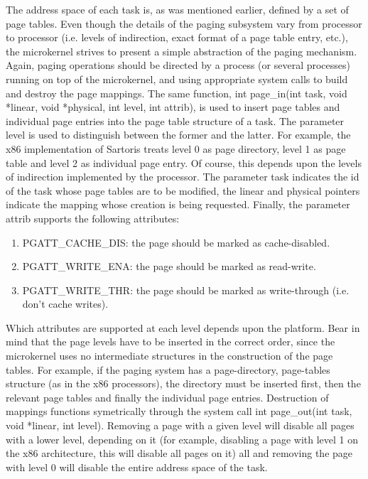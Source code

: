 \documentclass[11pt, letterpaper, twoside, english]{book}
\begin{document}
The address space of each task is, as was mentioned earlier, defined by a set of page tables. Even though the details of the paging subsystem vary from processor to processor (i.e. levels of indirection, exact format of a page table entry, etc.), the microkernel strives to present a simple abstraction of the paging mechanism. Again, paging operations should be directed by a process (or several processes) running on top of the microkernel, and using appropriate system calls to build and destroy the page mappings. The same function, \textsf{int page\_in(int task, void *linear, void *physical, int level, int attrib)}, is used to insert page tables and individual page entries into the page table structure of a task. The parameter \textsf{level} is used to distinguish between the former and the latter. For example, the x86 implementation of Sartoris treats level 0 as page directory, level 1 as page table and level 2 as individual page entry. Of course, this depends upon the levels of indirection implemented by the processor. The parameter \textsf{task} indicates the id of the task whose page tables are to be modified, the \textsf{linear} and \textsf{physical} pointers indicate the mapping whose creation is being requested. Finally, the parameter \textsf{attrib} supports the following attributes:

\begin{enumerate}
\item[] \textsf{PGATT\_CACHE\_DIS}: the page should be marked as cache-disabled.
\item[] \textsf{PGATT\_WRITE\_ENA}: the page should be marked as read-write.
\item[] \textsf{PGATT\_WRITE\_THR}: the page should be marked as write-through (i.e. don't cache writes).
\end{enumerate}

Which attributes are supported at each level depends upon the platform. Bear in mind that the page levels have to be inserted in the correct order, since the microkernel uses no intermediate structures in the construction of the page tables. For example, if the paging system has a page-directory, page-tables structure (as in the x86 processors), the directory must be inserted first, then the relevant page tables and finally the individual page entries. Destruction of mappings functions symetrically through the system call \textsf{int page\_out(int task, void *linear, int level)}. Removing a page with a given level will disable all pages with a lower level, depending on it (for example, disabling a page with level 1 on the x86 architecture, this will disable all pages on it) all and removing the page with level 0 will disable the entire address space of the task.
\end{document}
